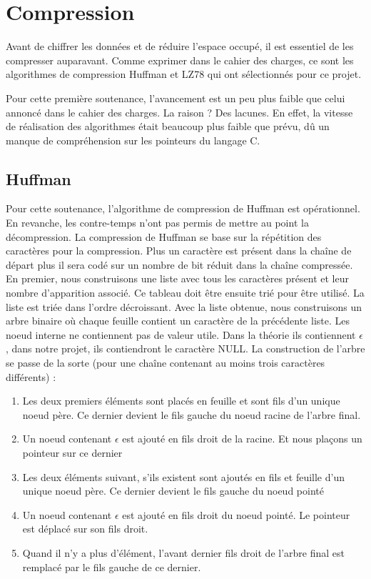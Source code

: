 \newpage

\section{Compression}
    Avant de chiffrer les données et de réduire l'espace occupé, il est essentiel de les compresser auparavant. Comme exprimer dans le cahier des charges, ce sont les algorithmes de compression Huffman et LZ78 qui ont sélectionnés pour ce projet.
    
    Pour cette première soutenance, l'avancement est un peu plus faible que celui annoncé dans le cahier des charges. La raison ? Des lacunes. En effet, la vitesse de réalisation des algorithmes était beaucoup plus faible que prévu, dû un manque de compréhension sur les pointeurs du langage C.
    
    \subsection{Huffman}
        Pour cette soutenance, l'algorithme de compression de Huffman est opérationnel. En revanche, les contre-temps n'ont pas permis de mettre au point la décompression.
        La compression de Huffman se base sur la répétition des caractères pour la compression. Plus un caractère est présent dans la chaîne de départ plus il sera codé sur un nombre de bit réduit dans la chaîne compressée.
        En premier, nous construisons une liste avec tous les caractères présent et leur nombre d'apparition associé. Ce tableau doit être ensuite trié pour être utilisé. La liste est triée dans l'ordre décroissant.
        Avec la liste obtenue, nous construisons un arbre binaire où chaque feuille contient un caractère de la précédente liste. Les noeud interne ne contiennent pas de valeur utile. Dans la théorie ils contiennent $\epsilon$, dans notre projet, ils contiendront le caractère NULL. La construction de l'arbre se passe de la sorte (pour une chaîne contenant au moins trois caractères différents) : 
        \begin{enumerate}
            \item Les deux premiers éléments sont placés en feuille et sont fils d'un unique noeud père. Ce dernier devient le fils gauche du noeud racine de l'arbre final.
            \item Un noeud contenant $\epsilon$ est ajouté en fils droit de la racine. Et nous plaçons un pointeur sur ce dernier
            \item Les deux éléments suivant, s'ils existent sont ajoutés en fils et feuille d'un unique noeud père. Ce dernier devient le fils gauche du noeud pointé
            \item Un noeud contenant $\epsilon$ est ajouté en fils droit du noeud pointé. Le pointeur est déplacé sur son fils droit.
            \item Quand il n'y a plus d'élément, l'avant dernier fils droit de l'arbre final est remplacé par le fils gauche de ce dernier.
        \end{enumerate}
